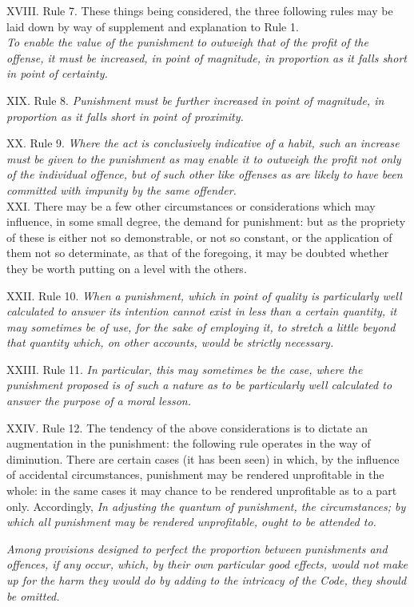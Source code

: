 \documentclass[12pt]{report}
\begin{document}
XVIII. Rule 7. These things being considered, the three following rules
may be laid down by way of supplement and explanation to Rule 1.\\
\emph{To enable the value of the punishment to outweigh that of the
profit} \emph{of the offense, it must be increased, in point of
magnitude, in proportion as it falls short in point of certainty.}

XIX. Rule 8. \emph{Punishment must be further increased in point of
magnitude, in proportion as it falls short in point of proximity.}

XX. Rule 9. \emph{Where the act is conclusively indicative of a habit,
such an increase must be given to the punishment as may enable it to
outweigh the profit not only of the individual offence, but of such
other like offenses as are likely to have been committed with impunity
by the same offender.}\\
XXI. There may be a few other circumstances or considerations which may
influence, in some small degree, the demand for punishment: but as the
propriety of these is either not so demonstrable, or not so constant, or
the application of them not so determinate, as that of the foregoing, it
may be doubted whether they be worth putting on a level with the others.

XXII. Rule 10. \emph{When a punishment, which in point of quality is
particularly well calculated to answer its intention cannot exist in
less than a certain quantity, it may sometimes be of use, for the sake
of employing it, to stretch a little beyond that quantity which, on
other accounts, would be strictly necessary.}

XXIII. Rule 11. \emph{In particular, this may sometimes be the case,
where the punishment proposed is of such a nature as to be particularly
well calculated to answer the purpose of a moral lesson.}

XXIV. Rule 12. The tendency of the above considerations is to dictate an
augmentation in the punishment: the following rule operates in the way
of diminution. There are certain cases (it has been seen) in which, by
the influence of accidental circumstances, punishment may be rendered
unprofitable in the whole: in the same cases it may chance to be
rendered unprofitable as to a part only. Accordingly, \emph{In adjusting
the quantum of punishment, the circumstances; by which all punishment
may be rendered unprofitable, ought to be attended to.}

\emph{Among provisions designed to perfect the proportion between
punishments and offences, if any occur, which, by their own particular
good effects, would not make up for the harm they would do by adding to
the intricacy of the Code, they should be omitted.}
\end{document}
